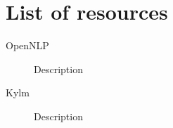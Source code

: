 \section{List of resources}
\label{sec:resources}
\begin{description}
\item[OpenNLP]{Description}
\item[Kylm]{Description}
\end{description}